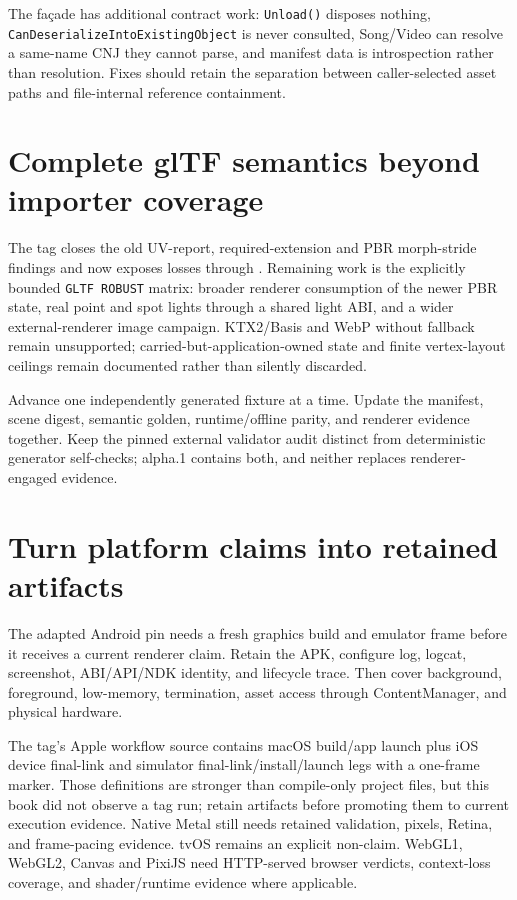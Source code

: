 The façade has additional contract work: \texttt{Unload()} disposes nothing,
\texttt{CanDeserializeIntoExistingObject} is never consulted, Song/Video can resolve a same-name
CNJ they cannot parse, and manifest data is introspection rather than resolution.  Fixes should
retain the separation between caller-selected asset paths and file-internal reference containment.

\section{Complete glTF semantics beyond importer coverage}

The tag closes the old UV-report, required-extension and PBR morph-stride findings and now exposes
losses through .  Remaining work is the explicitly bounded
\texttt{GLTF ROBUST} matrix: broader renderer consumption of the newer PBR state, real point and
spot lights through a shared light ABI, and a wider external-renderer image campaign.  KTX2/Basis
and WebP without fallback remain unsupported; carried-but-application-owned state and finite
vertex-layout ceilings remain documented rather than silently discarded.

Advance one independently generated fixture at a time. Update the manifest, scene digest,
semantic golden, runtime/offline parity, and renderer evidence together. Keep the pinned external
validator audit distinct from deterministic generator self-checks; alpha.1 contains both, and
neither replaces renderer-engaged evidence.

\section{Turn platform claims into retained artifacts}

The adapted Android pin needs a fresh graphics build and emulator frame before it receives a
current renderer claim.  Retain
the APK, configure log, logcat, screenshot, ABI/API/NDK identity, and lifecycle trace.  Then cover
background, foreground, low-memory, termination, asset access through ContentManager, and physical
hardware.

The tag's Apple workflow source contains macOS build/app launch plus iOS device final-link and
simulator final-link/install/launch legs with a one-frame marker. Those definitions are stronger
than compile-only project files, but this book did not observe a tag run; retain artifacts before
promoting them to current execution evidence. Native Metal still needs retained validation,
pixels, Retina, and frame-pacing evidence. tvOS remains an explicit non-claim. WebGL1, WebGL2,
Canvas and PixiJS need HTTP-served browser verdicts, context-loss coverage, and shader/runtime
evidence where applicable.

